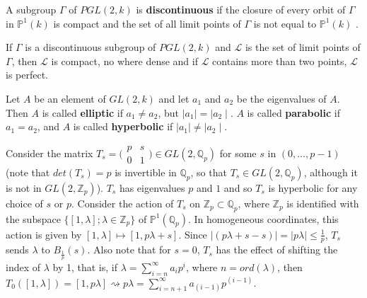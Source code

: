 \begin{definition*} \cite{gvdp} A subgroup $\Gamma$ of $PGL(2,k)$ is \textbf{discontinuous} if the closure of every orbit of $\Gamma$ in $\mathbb{P}^1(k)$ is compact and the set of all limit points of $\Gamma$ is not equal to  $\mathbb{P}^1(k)$ .
\end{definition*}

\begin{proposition*} \cite{gvdp} If $\Gamma$ is a discontinuous subgroup of $PGL(2,k)$  and $\mathcal{L}$ is the set of limit points of $\Gamma$, then $\mathcal{L}$ is compact, no where dense and if $\mathcal{L}$ contains more than two points, $\mathcal{L}$ is perfect.
\end{proposition*}

\begin{definition*} \cite{gvdp}
	Let $A$ be an element of $GL(2,k)$ and let $a_1$ and $a_2$  be the eigenvalues of $A$. Then $A$ is called \textbf{elliptic} if $a_1 \neq a_2$, but $\mid a_1\mid = \mid a_2\mid$. $A$ is called \textbf{parabolic} if $a_1 = a_2$, and $A$ is called \textbf{hyperbolic} if  $\mid a_1\mid \neq \mid a_2\mid$.
\end{definition*}

\begin{example} 
	Consider the matrix $T_s =  \bigl( \begin{smallmatrix}p & s\\ 0 & 1 \end{smallmatrix}\bigr) \in GL(2, \mathbb{Q}_p)$  for some $s$ in $(0,\ldots, p-1)$ (note that $det(T_s) = p$ is invertible in $\mathbb{Q}_p$, so that $T_s \in GL(2,\mathbb{Q}_p)$, although it is not in $GL(2, \mathbb{Z}_p)$). $T_s$ has eigenvalues $p$ and $1$ and so $T_s$ is hyperbolic for any choice of $s$ or $p$. Consider the action of $T_s$ on $\mathbb{Z}_p \subset \mathbb{Q}_p$, where $\mathbb{Z}_p$ is identified with the subspace $\{[1,\lambda];\lambda \in \mathbb{Z}_p \}$ of $\mathbb{P}^1(\mathbb{Q}_p)$. In homogeneous coordinates, this action is given by $[1,\lambda] \mapsto [1, p\lambda +s]$. Since $\mid (p\lambda +s -s)\mid = \mid p\lambda\mid \leq \frac{1}{p}$, $T_s$ sends $\lambda$ to $B_\frac{1}{p}(s)$. Also note that for $s = 0$, $T_s$ has the effect of shifting the index of $\lambda$ by 1, that is, if $\lambda = \sum_{i=n}^\infty a_ip^i$, where $n = ord(\lambda)$, then $T_0([1,\lambda]) = [1, p\lambda] \rightsquigarrow p\lambda = \sum_{i=n+1}^\infty a_{(i-1)}p^{(i-1)}$.	
\end{example}	

